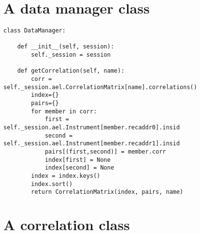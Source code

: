 \section{A data manager class}

\begin{verbatim}
class DataManager:

    def __init__(self, session):
        self._session = session

    def getCorrelation(self, name):
        corr = self._session.ael.CorrelationMatrix[name].correlations()
        index={}
        pairs={}
        for member in corr:   
            first = self._session.ael.Instrument[member.recaddr0].insid
            second = self._session.ael.Instrument[member.recaddr1].insid
            pairs[(first,second)] = member.corr    
            index[first] = None
            index[second] = None
        index = index.keys()
        index.sort()
        return CorrelationMatrix(index, pairs, name)
\end{verbatim}


\section{A correlation class}

